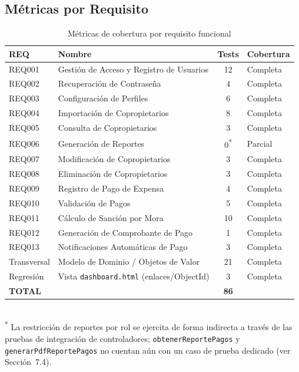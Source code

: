 \documentclass[12pt,a4paper]{article}
\begin{document}
\subsection{Métricas por Requisito}

\begin{table}[H]
\centering
\caption{Métricas de cobertura por requisito funcional}
\label{tab:metricas-req}
\begin{tabular}{lp{6.0cm}cl}
\toprule
\textbf{REQ} & \textbf{Nombre} & \textbf{Tests} & \textbf{Cobertura} \\
\midrule
REQ001 & Gestión de Acceso y Registro de Usuarios & 12 & Completa \\
REQ002 & Recuperación de Contraseña & 4 & Completa \\
REQ003 & Configuración de Perfiles & 6 & Completa \\
REQ004 & Importación de Copropietarios & 8 & Completa \\
REQ005 & Consulta de Copropietarios & 3 & Completa \\
REQ006 & Generación de Reportes & 0\textsuperscript{*} & Parcial \\
REQ007 & Modificación de Copropietarios & 3 & Completa \\
REQ008 & Eliminación de Copropietarios & 3 & Completa \\
REQ009 & Registro de Pago de Expensa & 4 & Completa \\
REQ010 & Validación de Pagos & 5 & Completa \\
REQ011 & Cálculo de Sanción por Mora & 10 & Completa \\
REQ012 & Generación de Comprobante de Pago & 1 & Completa \\
REQ013 & Notificaciones Automáticas de Pago & 3 & Completa \\
Transversal & Modelo de Dominio / Objetos de Valor & 21 & Completa \\
Regresión & Vista \texttt{dashboard.html} (enlaces/ObjectId) & 3 & Completa \\
\midrule
\textbf{TOTAL} & & \textbf{86} & \\
\bottomrule
\end{tabular}
\\[0.2cm]
{\footnotesize \textsuperscript{*} La restricción de reportes por rol se ejercita de forma
indirecta a través de las pruebas de integración de controladores; \texttt{obtenerReportePagos}
y \texttt{generarPdfReportePagos} no cuentan aún con un caso de prueba dedicado
(ver Sección~7.4).}
\end{table}
\end{document}
